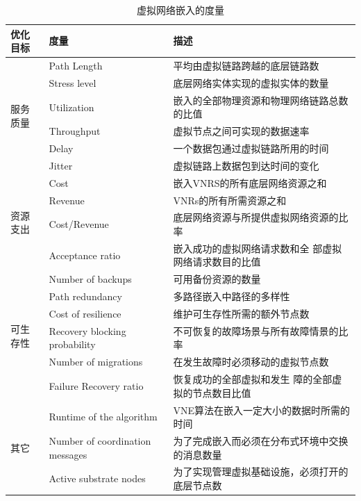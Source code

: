 \begin{table}[htbp]
\caption{虚拟网络嵌入的度量}\label{tab:MetricsForVirtualNetworkEmbedding}
\vspace{0.5em}\centering\wuhao
\begin{tabular}{lll}
\toprule[1.5pt]
优化目标  & 度量   & 描述  \\
\midrule[1pt]
\multirow{6}{*}{服务质量} & Path Length  & 平均由虚拟链路跨越的底层链路数\\
 & Stress level  & 底层网络实体实现的虚拟实体的数量\\
 & Utilization & 嵌入的全部物理资源和物理网络链路总数的比值\\
 & Throughput & 虚拟节点之间可实现的数据速率\\
 & Delay  & 一个数据包通过虚拟链路所用的时间
\\
 & Jitter  & 虚拟链路上数据包到达时间的变化\\
\hline
\multirow{4}{*}{资源支出} & Cost  & 嵌入VNRS的所有底层网络资源之和\\
 & Revenue  & VNRs的所有所需资源之和\\
 & Cost/Revenue & 底层网络资源与所提供虚拟网络资源的比率\\
 & Acceptance ratio & 嵌入成功的虚拟网络请求数和全 部虚拟网络请求数目的比值\\
\hline
\multirow{6}{*}{可生存性} & Number of backups  &可用备份资源的数量\\
 & Path redundancy  & 多路径嵌入中路径的多样性\\
 & Cost of resilience & 维护可生存性所需的额外节点数\\
 & Recovery blocking probability & 不可恢复的故障场景与所有故障情景的比率\\
 & Number of migrations  & 在发生故障时必须移动的虚拟节点数\\
 & Failure Recovery ratio  & 恢复成功的全部虚拟和发生 障的全部虚拟的节点数目比值\\
\hline
\multirow{3}{*}{其它} & Runtime of the algorithm  & VNE算法在嵌入一定大小的数据时所需的时间\\
 & Number of coordination messages  & 为了完成嵌入而必须在分布式环境中交换的消息数量\\
 & Active substrate nodes & 为了实现管理虚拟基础设施，必须打开的底层节点数\\
\bottomrule[1.5pt]
\end{tabular}
\vspace{\baselineskip}
\end{table}

